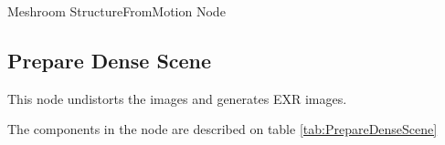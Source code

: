 \documentclass[12pt]{report}
\begin{document}
\begin{table}[H]
  \centering
  \caption{Meshroom StructureFromMotion Node}
  \label{tab:StructureFromMotion}
  \end{table}




\newpage
\subsection{Prepare Dense Scene}
This node undistorts the images and generates EXR images.\

The components in the node are described on table \ref{tab:PrepareDenseScene}
\end{document}
